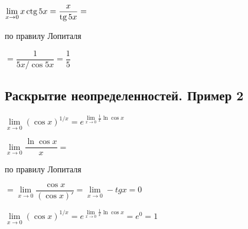 $ \lim\limits_{x \to 0} x \operatorname{ctg} 5x = \dfrac{x}{\operatorname{tg} 5x} = $

по правилу Лопиталя

$ = \dfrac{1}{5x/\cos 5x} = \dfrac{1}{5} $

\subsection{Раскрытие неопределенностей. Пример 2}

$ \lim\limits_{x \to 0} (\cos x)^{1/x} = e^{\lim\limits_{x \to 0} \frac{1}{x} \ln \cos x} $

$ \lim\limits_{x \to 0} \dfrac{\ln \cos x}{x} =  $

по правилу Лопиталя

$ = \lim\limits_{x \to 0} \dfrac{\cos x}{(\cos x)'} = \lim\limits_{x \to 0} -tg x = 0 $

$ \lim\limits_{x \to 0} (\cos x)^{1/x} = e^{\lim\limits_{x \to 0} \frac{1}{x} \ln \cos x} = e^{0} = 1$